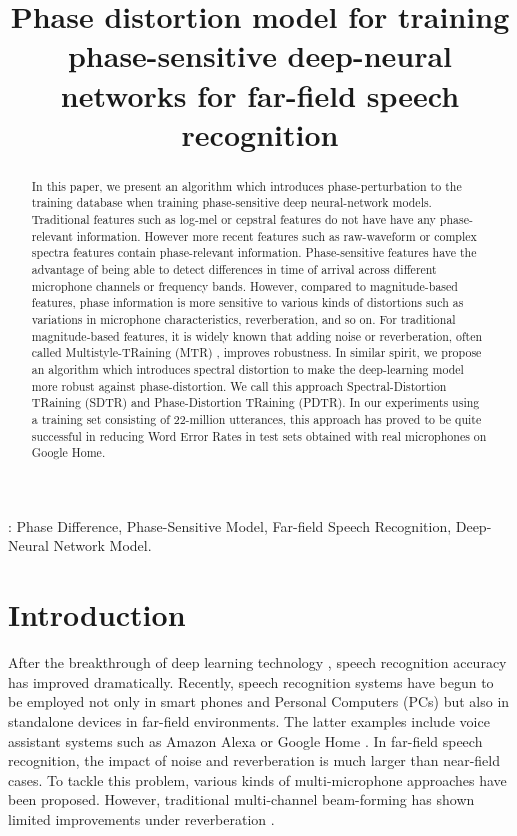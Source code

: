 \documentclass[a4paper]{article}
\title{Phase distortion model for training phase-sensitive deep-neural networks for far-field speech recognition}
\begin{document}
\maketitle
\begin{abstract}
In this paper, we present an algorithm which introduces phase-perturbation
to the training database when training phase-sensitive deep neural-network
models. Traditional features such as log-mel or cepstral features do not have
have any phase-relevant information. However more recent features such as
raw-waveform or complex spectra features contain phase-relevant information.
Phase-sensitive features have the advantage of being able to detect differences
in time of arrival across different microphone channels or
frequency bands. However, compared to magnitude-based features, phase
information is more sensitive to various kinds of distortions such as
variations in microphone characteristics, reverberation, and so on.
For traditional magnitude-based features, it is widely known that
adding noise or reverberation, often called Multistyle-TRaining (MTR)
, improves robustness. In similar spirit, we propose an algorithm which introduces spectral
distortion to make the deep-learning model more robust against phase-distortion.
We call this approach Spectral-Distortion TRaining (SDTR) and Phase-Distortion TRaining (PDTR).
In our experiments using a training set consisting of 22-million utterances, this approach has
proved to be quite successful in reducing Word Error Rates in test sets
obtained with real microphones on Google Home.
\end{abstract}
: Phase Difference, Phase-Sensitive Model,
Far-field Speech Recognition, Deep-Neural Network Model.


\section{Introduction}
After the breakthrough of deep learning technology
\cite{V_Vanhoucke_Deep_Learning_NIPS_Workshop_2011,
G_Hinton_IEEE_Signal_Process_Mag_2012, T_Sainath_ICASSP_2015_1,
T_Sainath_IEEETran_2017_1}, speech recognition accuracy has
improved dramatically. Recently, speech recognition systems
have begun to be employed not only in smart phones and Personal Computers
(PCs) but also in standalone devices in far-field environments.
The latter examples include voice assistant systems such as Amazon Alexa
or Google Home \cite{C_Kim_INTERSPEECH_2017_1, B_Li_INTERSPEECH_2017_1}.
In far-field speech recognition, the impact of noise and reverberation
is much larger than near-field cases. To tackle this problem, various
kinds of multi-microphone approaches
\cite{U_H_Yapanel_SpeechComm_2008, C_Kim_INTERSPEECH_2015, C_Kim_ICASSP_2012_2,
C_Kim_ICASSP_2011_2, R_M_Stern_HSCMA_2008} have been proposed. However,
traditional multi-channel beam-forming has shown limited improvements
under reverberation \cite{C_Kim_INTERSPEECH_2009_1}.
\end{document}
